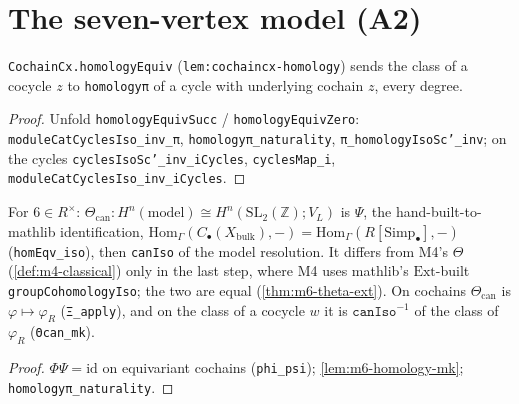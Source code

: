 \section{The seven-vertex model (A2)}

\begin{lemma}\label{lem:m6-homology-mk}
  \leanok
  \texttt{CochainCx.homologyEquiv} (\texttt{lem:cochaincx-homology}) sends the class of a cocycle $z$ to \texttt{homologyπ} of a cycle
  with underlying cochain $z$, every degree.
\end{lemma}
\begin{proof}
  \leanok
  Unfold \texttt{homologyEquivSucc} / \texttt{homologyEquivZero}: \texttt{moduleCatCyclesIso\_inv\_π}, \texttt{homologyπ\_naturality},
  \texttt{π\_homologyIsoSc'\_inv}; on the cycles \texttt{cyclesIsoSc'\_inv\_iCycles}, \texttt{cyclesMap\_i},
  \texttt{moduleCatCyclesIso\_inv\_iCycles}.
\end{proof}

\begin{definition}\label{def:m6-thetacan}
  \leanok
  For $6\in R^\times$: $\Theta_{\mathrm{can}}\colon H^n(\mathrm{model})\cong H^n(\mathrm{SL}_2(\mathbb Z);V_L)$ is $\Psi$, the hand-built-to-mathlib
  identification, $\mathrm{Hom}_\Gamma(C_\bullet(X_{\mathrm{bulk}}),-)=\mathrm{Hom}_\Gamma(R[\mathrm{Simp}_\bullet],-)$ (\texttt{homEqv\_iso}), then
  \texttt{canIso} of the model resolution. It differs from M4's $\Theta$ (\ref{def:m4-classical}) only in the last step, where M4 uses
  mathlib's $\mathrm{Ext}$-built \texttt{groupCohomologyIso}; the two are equal (\ref{thm:m6-theta-ext}). On cochains $\Theta_{\mathrm{can}}$ is
  $\varphi\mapsto\varphi_R$ (\texttt{Ξ\_apply}), and on the class of a cocycle $w$ it is $\texttt{canIso}^{-1}$ of the class of
  $\varphi_R$ (\texttt{Θcan\_mk}).
\end{definition}
\begin{proof}
  \leanok
  $\Phi\Psi=\mathrm{id}$ on equivariant cochains (\texttt{phi\_psi}); \ref{lem:m6-homology-mk}; \texttt{homologyπ\_naturality}.
\end{proof}

